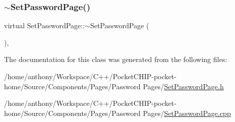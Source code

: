\mbox{\label{classSetPasswordPage_a97defbb2e5484bc6105cfec5327e569a}} 
\subsubsection{\texorpdfstring{$\sim$\+Set\+Password\+Page()}{~SetPasswordPage()}}
{\footnotesize\ttfamily virtual Set\+Password\+Page\+::$\sim$\+Set\+Password\+Page (\begin{DoxyParamCaption}{ }\end{DoxyParamCaption})\hspace{0.3cm}{\ttfamily [inline]}, {\ttfamily [virtual]}}



The documentation for this class was generated from the following files\+:\begin{DoxyCompactItemize}
\item 
/home/anthony/\+Workspace/\+C++/\+Pocket\+C\+H\+I\+P-\/pocket-\/home/\+Source/\+Components/\+Pages/\+Password Pages/\mbox{\hyperlink{SetPasswordPage_8h}{Set\+Password\+Page.\+h}}\item 
/home/anthony/\+Workspace/\+C++/\+Pocket\+C\+H\+I\+P-\/pocket-\/home/\+Source/\+Components/\+Pages/\+Password Pages/\mbox{\hyperlink{SetPasswordPage_8cpp}{Set\+Password\+Page.\+cpp}}\end{DoxyCompactItemize}
